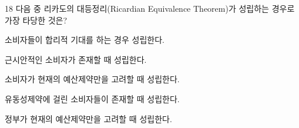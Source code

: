 \begin{question}{18}
다음 중 리카도의 대등정리(Ricardian Equivalence Theorem)가 성립하는 경우로 가장 타당한 것은?
\begin{choices}
  \item 소비자들이 합리적 기대를 하는 경우 성립한다.
  \item 근시안적인 소비자가 존재할 때 성립한다.
  \item 소비자가 현재의 예산제약만을 고려할 때 성립한다.
  \item 유동성제약에 걸린 소비자들이 존재할 때 성립한다.
  \item 정부가 현재의 예산제약만을 고려할 때 성립한다.
\end{choices}
\end{question}
